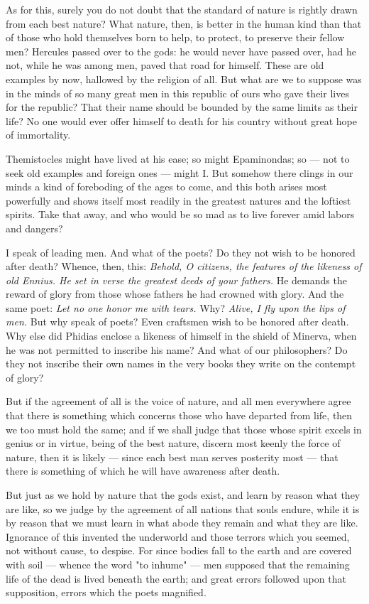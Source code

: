  As for this, surely you do not doubt that the standard of nature is rightly drawn from each best nature? What nature, then, is better in the human kind than that of those who hold themselves born to help, to protect, to preserve their fellow men? Hercules passed over to the gods: he would never have passed over, had he not, while he was among men, paved that road for himself. These are old examples by now, hallowed by the religion of all. But what are we to suppose was in the minds of so many great men in this republic of ours who gave their lives for the republic? That their name should be bounded by the same limits as their life? No one would ever offer himself to death for his country without great hope of immortality.

 Themistocles might have lived at his ease; so might Epaminondas; so — not to seek old examples and foreign ones — might I. But somehow there clings in our minds a kind of foreboding of the ages to come, and this both arises most powerfully and shows itself most readily in the greatest natures and the loftiest spirits. Take that away, and who would be so mad as to live forever amid labors and dangers?

 I speak of leading men. And what of the poets? Do they not wish to be honored after death? Whence, then, this: \textit{Behold, O citizens, the features of the likeness of old Ennius. He set in verse the greatest deeds of your fathers.} He demands the reward of glory from those whose fathers he had crowned with glory. And the same poet: \textit{Let no one honor me with tears.} Why? \textit{Alive, I fly upon the lips of men.} But why speak of poets? Even craftsmen wish to be honored after death. Why else did Phidias enclose a likeness of himself in the shield of Minerva, when he was not permitted to inscribe his name? And what of our philosophers? Do they not inscribe their own names in the very books they write on the contempt of glory?

 But if the agreement of all is the voice of nature, and all men everywhere agree that there is something which concerns those who have departed from life, then we too must hold the same; and if we shall judge that those whose spirit excels in genius or in virtue, being of the best nature, discern most keenly the force of nature, then it is likely — since each best man serves posterity most — that there is something of which he will have awareness after death.

 But just as we hold by nature that the gods exist, and learn by reason what they are like, so we judge by the agreement of all nations that souls endure, while it is by reason that we must learn in what abode they remain and what they are like. Ignorance of this invented the underworld and those terrors which you seemed, not without cause, to despise. For since bodies fall to the earth and are covered with soil — whence the word "to inhume" — men supposed that the remaining life of the dead is lived beneath the earth; and great errors followed upon that supposition, errors which the poets magnified.

